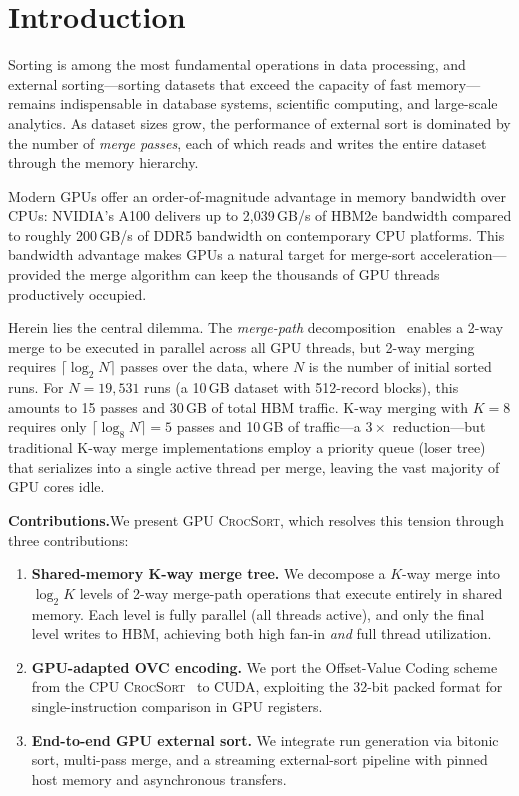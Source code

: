 \documentclass[conference,10pt]{IEEEtran}
\newcommand{\crocsort}{\textsc{CrocSort}\xspace}
\newcommand{\gpucrocsort}{\textsc{GPU CrocSort}\xspace}
\begin{document}
\section{Introduction}
\label{sec:intro}

Sorting is among the most fundamental operations in data processing, and
external sorting---sorting datasets that exceed the capacity of fast
memory---remains indispensable in database systems, scientific computing, and
large-scale analytics.  As dataset sizes grow, the performance of external
sort is dominated by the number of \emph{merge passes}, each of which reads
and writes the entire dataset through the memory hierarchy.

Modern GPUs offer an order-of-magnitude advantage in memory bandwidth over
CPUs: NVIDIA's A100 delivers up to 2,039\,GB/s of HBM2e bandwidth compared
to roughly 200\,GB/s of DDR5 bandwidth on contemporary CPU platforms.  This
bandwidth advantage makes GPUs a natural target for merge-sort
acceleration---provided the merge algorithm can keep the thousands of GPU
threads productively occupied.

Herein lies the central dilemma.  The \emph{merge-path}
decomposition~\cite{green2012} enables a 2-way merge to be executed in
parallel across all GPU threads, but 2-way merging requires
$\lceil\log_2 N\rceil$ passes over the data, where $N$ is the number of
initial sorted runs.  For $N{=}19{,}531$ runs (a 10\,GB dataset with
512-record blocks), this amounts to 15 passes and 30\,GB of total HBM
traffic.  K-way merging with $K{=}8$ requires only
$\lceil\log_8 N\rceil = 5$ passes and 10\,GB of traffic---a $3\times$
reduction---but traditional K-way merge implementations employ a priority
queue (loser tree) that serializes into a single active thread per merge,
leaving the vast majority of GPU cores idle.

\textbf{Contributions.}\quad We present \gpucrocsort, which resolves this
tension through three contributions:

\begin{enumerate}[leftmargin=*,topsep=2pt,itemsep=1pt]
  \item \textbf{Shared-memory K-way merge tree.}  We decompose a $K$-way
    merge into $\log_2 K$ levels of 2-way merge-path operations that
    execute entirely in shared memory.  Each level is fully parallel (all
    threads active), and only the final level writes to HBM, achieving both
    high fan-in \emph{and} full thread utilization.
  \item \textbf{GPU-adapted OVC encoding.}  We port the Offset-Value Coding
    scheme from the CPU \crocsort~\cite{crocsort2026} to CUDA, exploiting
    the 32-bit packed format for single-instruction comparison in GPU
    registers.
  \item \textbf{End-to-end GPU external sort.}  We integrate run generation
    via bitonic sort, multi-pass merge, and a streaming external-sort
    pipeline with pinned host memory and asynchronous transfers.
\end{enumerate}
\end{document}
